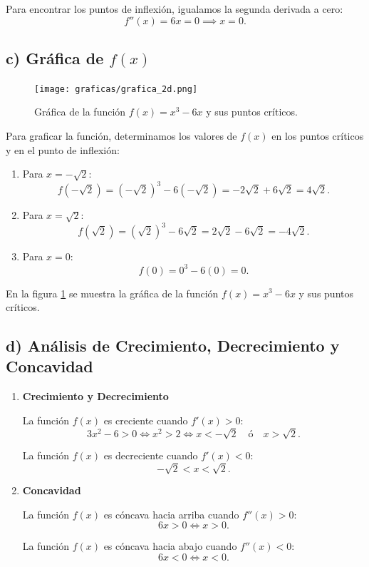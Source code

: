 \documentclass{article}
\begin{document}
Para encontrar los puntos de inflexión, igualamos la segunda derivada a cero:
\[
f''(x) = 6x = 0 \implies x = 0.
\]

\subsection*{c) Gráfica de $f(x)$}

\begin{figure}[h]
	\centering
	\texttt{[image: graficas/grafica\_2d.png]}
	\caption{Gráfica de la función \( f(x) = x^3 - 6x \) y sus puntos críticos.}
	\label{fig:grafica_funcion}
\end{figure}

Para graficar la función, determinamos los valores de \( f(x) \) en los puntos críticos y en el punto de inflexión:
\begin{enumerate}
	\item Para \( x = -\sqrt{2} \):
	\[
	f(-\sqrt{2}) = (-\sqrt{2})^3 - 6(-\sqrt{2}) = -2\sqrt{2} + 6\sqrt{2} = 4\sqrt{2}.
	\]
	
	\item Para \( x = \sqrt{2} \):
	\[
	f(\sqrt{2}) = (\sqrt{2})^3 - 6\sqrt{2} = 2\sqrt{2} - 6\sqrt{2} = -4\sqrt{2}.
	\]
	
	\item Para \( x = 0 \):
	\[
	f(0) = 0^3 - 6(0) = 0.
	\]
\end{enumerate}

En la figura \ref{fig:grafica_funcion} se muestra la gráfica de la función \( f(x) = x^3 - 6x \) y sus puntos críticos.\cite{Elizondo2024}

\subsection*{d) Análisis de Crecimiento, Decrecimiento y Concavidad}
\begin{enumerate}
	\item \textbf{Crecimiento y Decrecimiento}
	
	La función \( f(x) \) es creciente cuando \( f'(x) > 0 \):
	\[
	3x^2 - 6 > 0 \iff x^2 > 2 \iff x < -\sqrt{2} \quad \text{ó} \quad x > \sqrt{2}.
	\]
	
	La función \( f(x) \) es decreciente cuando \( f'(x) < 0 \):
	\[
	-\sqrt{2} < x < \sqrt{2}.
	\]
	
	\item \textbf{Concavidad}
	
	La función \( f(x) \) es cóncava hacia arriba cuando \( f''(x) > 0 \):
	\[
	6x > 0 \iff x > 0.
	\]
	
	La función \( f(x) \) es cóncava hacia abajo cuando \( f''(x) < 0 \):
	\[
	6 x < 0 \iff x < 0.
	\]
\end{enumerate}
\end{document}
